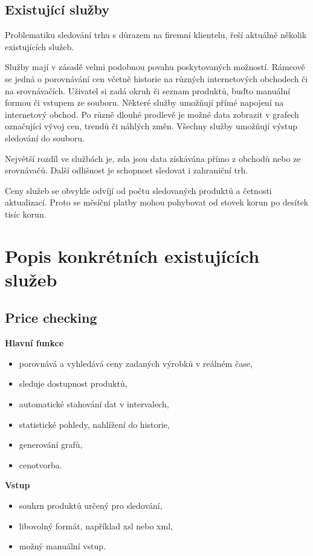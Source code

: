 \documentclass[thesis=B,czech]{FITthesis}[2012/06/26]
\begin{document}
\subsection{Existující služby}

Problematiku sledování trhu s důrazem na firemní klientelu, řeší aktuálně několik existujících služeb.
\par
Služby mají v zásadě velmi podobnou povahu poskytovaných možností. Rámcově se jedná o porovnávání cen včetně historie na různých internetových
obchodech či na srovnávačích. Uživatel si zadá okruh či seznam produktů, buďto manuální formou či vstupem ze souboru. Některé služby umožňují přímé napojení na internetový obchod. Po různě dlouhé prodlevě je možné data zobrazit v grafech označující vývoj cen, trendů či náhlých změn.
Všechny služby umožňují výstup sledování do souboru.
\par
Největší rozdíl ve službách je, zda jsou data získávána přímo z obchodů nebo ze srovnávačů. Další odlišnost je schopnost sledovat i zahraniční trh.
\par
Ceny služeb se obvykle odvíjí od počtu sledovaných produktů a četnosti aktualizací. Proto se měsíční platby mohou 
pohybovat od stovek korun po desítek tisíc korun.

\section{Popis konkrétních existujících služeb}

\subsection{Price checking~\cite{priceChecking}} 


\textbf{Hlavní funkce}
\begin{itemize}
\item porovnává a vyhledává ceny zadaných výrobků v reálném čase,
\item sleduje dostupnost produktů,
\item automatické stahování dat v intervalech,
\item statistické pohledy, nahlížení do historie,
\item generování grafů,
\item cenotvorba.
\end{itemize}

\newpage

\textbf{Vstup}
\begin{itemize}
\item souhrn produktů určený pro sledování,
\item libovolný formát, například xsl nebo xml,
\item možný manuální vstup.
\end{itemize}
\end{document}
